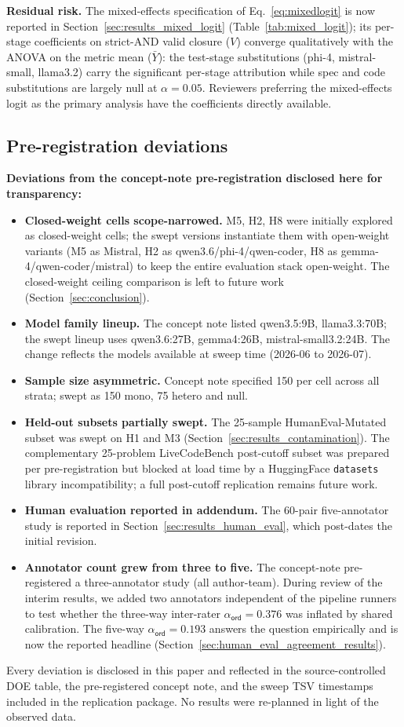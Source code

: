 \textbf{Residual risk.} The mixed-effects specification of Eq.~\ref{eq:mixedlogit} is now reported in Section~\ref{sec:results_mixed_logit} (Table~\ref{tab:mixed_logit}); its per-stage coefficients on strict-AND valid closure ($V$) converge qualitatively with the ANOVA on the metric mean ($\bar{Y}$): the test-stage substitutions (phi-4, mistral-small, llama3.2) carry the significant per-stage attribution while spec and code substitutions are largely null at $\alpha = 0.05$. Reviewers preferring the mixed-effects logit as the primary analysis have the coefficients directly available.

\subsection{Pre-registration deviations}

\textbf{Deviations from the concept-note pre-registration disclosed here for transparency:}

\begin{itemize}
  \item \textbf{Closed-weight cells scope-narrowed.} M5, H2, H8 were initially explored as closed-weight cells; the swept versions instantiate them with open-weight variants (M5 as Mistral, H2 as qwen3.6/phi-4/qwen-coder, H8 as gemma-4/qwen-coder/mistral) to keep the entire evaluation stack open-weight. The closed-weight ceiling comparison is left to future work (Section~\ref{sec:conclusion}).
  \item \textbf{Model family lineup.} The concept note listed qwen3.5:9B, llama3.3:70B; the swept lineup uses qwen3.6:27B, gemma4:26B, mistral-small3.2:24B. The change reflects the models available at sweep time (2026-06 to 2026-07).
  \item \textbf{Sample size asymmetric.} Concept note specified 150 per cell across all strata; swept as 150 mono, 75 hetero and null.
  \item \textbf{Held-out subsets partially swept.} The 25-sample HumanEval-Mutated subset was swept on H1 and M3 (Section~\ref{sec:results_contamination}). The complementary 25-problem LiveCodeBench post-cutoff subset was prepared per pre-registration but blocked at load time by a HuggingFace \texttt{datasets} library incompatibility; a full post-cutoff replication remains future work.
  \item \textbf{Human evaluation reported in addendum.} The 60-pair five-annotator study is reported in Section~\ref{sec:results_human_eval}, which post-dates the initial revision.
  \item \textbf{Annotator count grew from three to five.} The concept-note pre-registered a three-annotator study (all author-team). During review of the interim results, we added two annotators independent of the pipeline runners to test whether the three-way inter-rater $\alpha_{\textsf{ord}} = 0.376$ was inflated by shared calibration. The five-way $\alpha_{\textsf{ord}} = 0.193$ answers the question empirically and is now the reported headline (Section~\ref{sec:human_eval_agreement_results}).
\end{itemize}

Every deviation is disclosed in this paper and reflected in the source-controlled DOE table, the pre-registered concept note, and the sweep TSV timestamps included in the replication package. No results were re-planned in light of the observed data.
